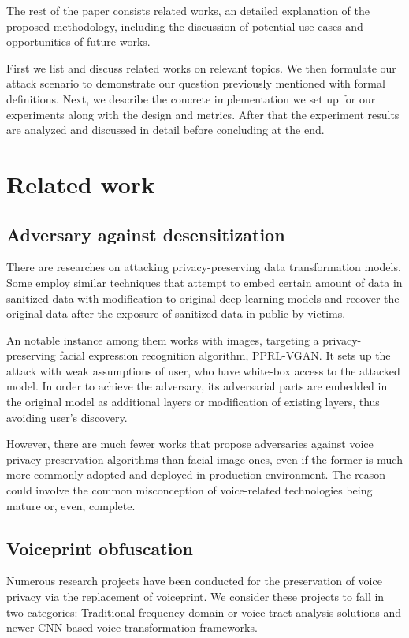 \documentclass[journal]{IEEEtran} %
\begin{document}
The rest of the paper consists related works, an detailed explanation of the proposed methodology, including the discussion of potential use cases and opportunities of future works.

First we list and discuss related works on relevant topics. We then formulate our attack scenario to demonstrate our question previously mentioned with formal definitions. Next, we describe the concrete implementation we set up for our experiments along with the design and metrics. After that the experiment results are analyzed and discussed in detail before concluding at the end.

\label{seg:related}
\section{Related work}

\subsection{Adversary against desensitization}

There are researches on attacking privacy-preserving data transformation models. Some employ similar techniques that attempt to embed certain amount of data in sanitized data with modification to original deep-learning models and recover the original data after the exposure of sanitized data in public by victims. 

An notable instance among them works with images, targeting a privacy-preserving facial expression recognition algorithm, PPRL-VGAN. It sets up the attack with weak assumptions of user, who have white-box access to the attacked model. In order to achieve the adversary, its adversarial parts are embedded in the original model as additional layers or modification of existing layers, thus avoiding user's discovery.\cite{pprl-vgan,subvert}

However, there are much fewer works that propose adversaries against voice privacy preservation algorithms than facial image ones, even if the former is much more commonly adopted and deployed in production environment. The reason could involve the common misconception of voice-related technologies being mature or, even, complete.

\subsection{Voiceprint obfuscation}

Numerous research projects have been conducted for the preservation of voice privacy via the replacement of voiceprint. We consider these projects to fall in two categories: Traditional frequency-domain or voice tract analysis solutions and newer CNN-based voice transformation frameworks.
\end{document}

